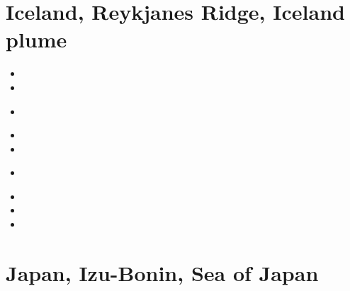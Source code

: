 \section{Iceland, Reykjanes Ridge, Iceland plume}

\begin{small}
\begin{itemize}
\item[\nineteeneightynine]
\item[\nineteenninetysix]
\item[\nineteenninetynine]
\\ 
\item[\twothousand]
\item[\twothousandfour]
\item[\twothousandseventeen]
 \\
\item[\twothousandnineteen]
\item[\twothousandtwenty]
\item[\twothousandtwentytwo]
\end{itemize}
\end{small} 


\section{Japan, Izu-Bonin, Sea of Japan} 

